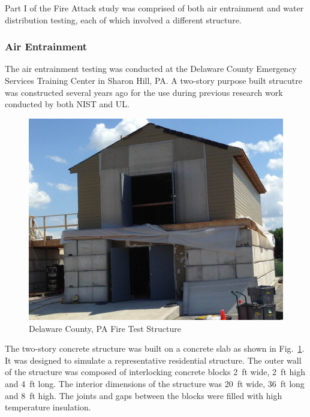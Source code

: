 \documentclass{article}
\begin{document}
Part I of the Fire Attack study was comprised of both air entrainment and water distribution testing, each of which involved a different structure.

\subsubsection{Air Entrainment}

The air entrainment testing was conducted at the Delaware County Emergency Services Training Center in Sharon Hill, PA. A two-story purpose built strucutre was constructed several years ago for the use during previous research work conducted by both NIST and UL.

\begin{figure}[!ht]
	\centering
	\includegraphics[width=6in]{Figures/Air_Entrainment/DelCo_2story.jpg}
	\caption{Delaware County, PA Fire Test Structure}
	\label{fig:Delaware_County,_PA_Fire_Test_Structure}
\end{figure}

The two-story concrete structure was built on a concrete slab as shown in Fig.~\ref{fig:Delaware_County,_PA_Fire_Test_Structure}. It was designed to simulate a representative residential structure. The outer wall of the structure was composed of interlocking concrete blocks 2~ft wide, 2~ft high and 4~ft long. The interior dimensions of the structure was 20~ft wide, 36~ft long and 8~ft high. The joints and gaps between the blocks were filled with high temperature insulation.

\clearpage
\end{document}
